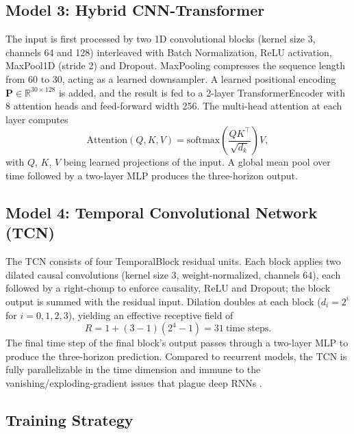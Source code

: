 \documentclass[12pt]{article}
\begin{document}
\subsection{Model 3: Hybrid CNN-Transformer}

The input is first processed by two 1D convolutional blocks (kernel size 3, channels 64 and 128) interleaved with Batch Normalization, ReLU activation, MaxPool1D (stride 2) and Dropout. MaxPooling compresses the sequence length from 60 to 30, acting as a learned downsampler. A learned positional encoding $\mathbf{P} \in \mathbb{R}^{30 \times 128}$ is added, and the result is fed to a 2-layer TransformerEncoder with 8 attention heads and feed-forward width 256. The multi-head attention at each layer computes
\begin{equation}
    \mathrm{Attention}(Q,K,V) = \mathrm{softmax}\!\left(\frac{QK^\top}{\sqrt{d_k}}\right)V,
\end{equation}
with $Q$, $K$, $V$ being learned projections of the input. A global mean pool over time followed by a two-layer MLP produces the three-horizon output.

\subsection{Model 4: Temporal Convolutional Network (TCN)}

The TCN consists of four TemporalBlock residual units. Each block applies two dilated causal convolutions (kernel size 3, weight-normalized, channels 64), each followed by a right-chomp to enforce causality, ReLU and Dropout; the block output is summed with the residual input. Dilation doubles at each block ($d_i = 2^i$ for $i=0,1,2,3$), yielding an effective receptive field of
\[
R = 1 + (3-1)(2^4 - 1) = 31\ \text{time steps}.
\]
The final time step of the final block's output passes through a two-layer MLP to produce the three-horizon prediction. Compared to recurrent models, the TCN is fully parallelizable in the time dimension and immune to the vanishing/exploding-gradient issues that plague deep RNNs \cite{bai2018tcn,jin2025tcn}.

\subsection{Training Strategy}
\end{document}
